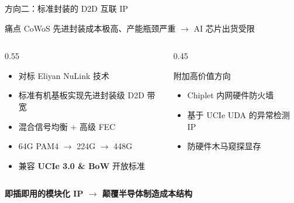 \documentclass[aspectratio=169, 10pt, UTF8]{ctexbeamer}
\begin{document}
\begin{frame}{方向二：标准封装的 D2D 互联 IP}
  \begin{block}{痛点}
    CoWoS 先进封装成本极高、产能瓶颈严重 $\to$ AI 芯片出货受限
  \end{block}

  \vspace{6pt}
  \begin{columns}[T]
    \begin{column}{0.55\textwidth}
      \begin{itemize}
        \item 对标 Eliyan NuLink 技术
        \item 标准有机基板实现先进封装级 D2D 带宽
        \item 混合信号均衡 + 高级 FEC
        \item 64G PAM4 $\to$ 224G $\to$ 448G
        \item 兼容 \textbf{UCIe 3.0 \& BoW} 开放标准
      \end{itemize}
    \end{column}
    \begin{column}{0.45\textwidth}
      \begin{exampleblock}{附加高价值方向}
        \begin{itemize}
          \item Chiplet 内网硬件防火墙
          \item 基于 UCIe UDA 的异常检测 IP
          \item 防硬件木马窥探显存
        \end{itemize}
      \end{exampleblock}
    \end{column}
  \end{columns}

  \vspace{8pt}
  \begin{center}
    \textbf{即插即用的模块化 IP $\to$ 颠覆半导体制造成本结构}
  \end{center}
\end{frame}
\end{document}

